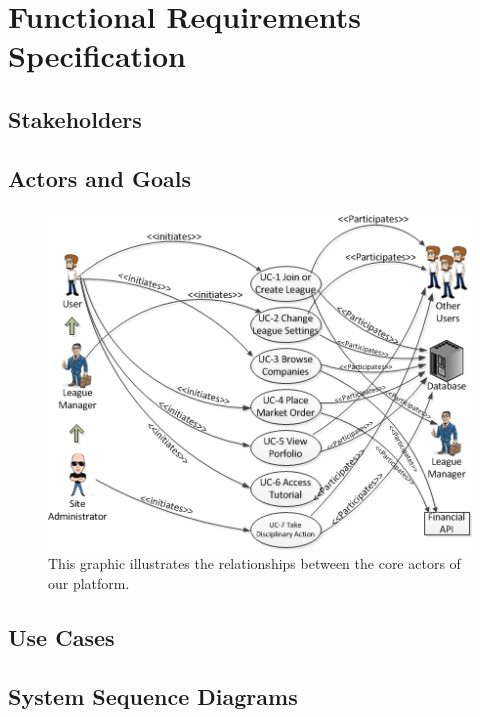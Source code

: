 \chapter{Functional Requirements Specification}


\section{Stakeholders}


\section{Actors and Goals}



\begin{figure}
\centering
\includegraphics[width=5.5in]{./Diagrams/UseCaseDiagram.png}
\caption{This graphic illustrates the relationships between the core actors of our platform.}
\end{figure}

\section{Use Cases}



\section{System Sequence Diagrams}

